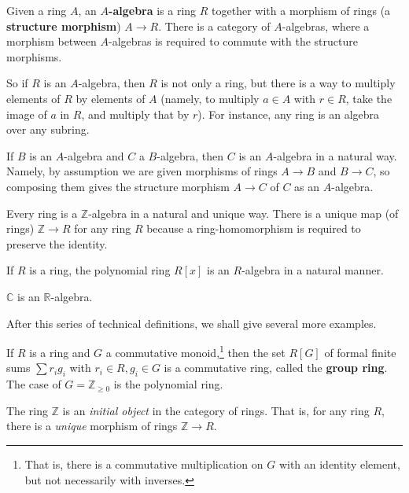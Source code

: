 \begin{definition} 
Given a ring $A$, an \textbf{$A$-algebra} is a ring $R$ together with a
morphism of rings (a \textbf{structure morphism}) $A \to R$. There is a category of $A$-algebras, where a
morphism between $A$-algebras is required to commute with the structure
morphisms. 
\end{definition} 

So if $R$ is an $A$-algebra, then $R$ is not only a ring, but there is a way
to multiply elements of $R$ by elements of $A$ (namely, to multiply $a \in A$
with $r \in R$, take the image of $a $ in $R$, and multiply that by $r$).
For instance, any ring is an algebra over any subring.

If $B$ is an $A$-algebra and $C$ a $B$-algebra, then $C$ is an $A$-algebra in a
natural way. Namely, by assumption we are given morphisms of rings $A \to B$
and $B \to C$, so composing them gives the structure morphism $A \to C$ of $C$
as an $A$-algebra. 


\begin{example} 
Every ring is a $\mathbb{Z}$-algebra in a natural and unique way. There is a
unique map (of rings) $\mathbb{Z} \to R$ for any ring $R$ because a
ring-homomorphism is required to preserve the identity. 
\end{example}

\begin{example} 
If $R$ is a ring, the polynomial ring $R[x]$ is an $R$-algebra in a natural
manner.
\end{example} 

\begin{example} 
$\mathbb{C}$ is an $\mathbb{R}$-algebra.
\end{example} 


After this series of technical definitions, we shall give several more  examples.
\begin{exercise} 
If $R$ is a ring and $G$ a commutative monoid,\footnote{That is, there is a
commutative multiplication on $G$ with an identity element, but not
necessarily with inverses.} then the set
$R[G]$ of formal finite sums $\sum r_i g_i$ with $r_i \in R, g_i \in G$ is a
commutative ring, called the \textbf{group ring}. The case of $G =
\mathbb{Z}_{\geq 0}$ is the polynomial ring. 
\end{exercise} 

\begin{exercise}
\label{integersinitial}
The ring $\mathbb{Z}$ is an \emph{initial object} in the category of rings.
That is, for any ring $R$, there is a \emph{unique} morphism of rings
$\mathbb{Z} \to R$.
\end{exercise} 

